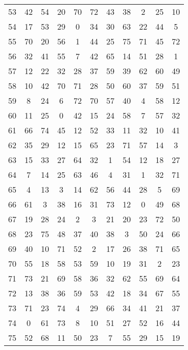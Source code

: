 \begin{table}
\begin{tabular}{c c c c c c c c c c c }
53 & 42 & 54 & 20 & 70 & 72 & 43 & 38 & 2 & 25 & 10 \\
54 & 17 & 53 & 29 & 0 & 34 & 30 & 63 & 22 & 44 & 5 \\
55 & 70 & 20 & 56 & 1 & 44 & 25 & 75 & 71 & 45 & 72 \\
56 & 32 & 41 & 55 & 7 & 42 & 65 & 14 & 51 & 28 & 1 \\
57 & 12 & 22 & 32 & 28 & 37 & 59 & 39 & 62 & 60 & 49 \\
58 & 10 & 42 & 70 & 71 & 28 & 50 & 60 & 37 & 59 & 51 \\
59 & 8 & 24 & 6 & 72 & 70 & 57 & 40 & 4 & 58 & 12 \\
60 & 11 & 25 & 0 & 42 & 15 & 24 & 58 & 7 & 57 & 32 \\
61 & 66 & 74 & 45 & 12 & 52 & 33 & 11 & 32 & 10 & 41 \\
62 & 35 & 29 & 12 & 15 & 65 & 23 & 71 & 57 & 14 & 3 \\
63 & 15 & 33 & 27 & 64 & 32 & 1 & 54 & 12 & 18 & 27 \\
64 & 7 & 14 & 25 & 63 & 46 & 4 & 31 & 1 & 32 & 71 \\
65 & 4 & 13 & 3 & 14 & 62 & 56 & 44 & 28 & 5 & 69 \\
66 & 61 & 3 & 38 & 16 & 31 & 73 & 12 & 0 & 49 & 68 \\
67 & 19 & 28 & 24 & 2 & 3 & 21 & 20 & 23 & 72 & 50 \\
68 & 23 & 75 & 48 & 37 & 40 & 38 & 3 & 50 & 24 & 66 \\
69 & 40 & 10 & 71 & 52 & 2 & 17 & 26 & 38 & 71 & 65 \\
70 & 55 & 18 & 58 & 53 & 59 & 10 & 19 & 31 & 2 & 23 \\
71 & 73 & 21 & 69 & 58 & 36 & 32 & 62 & 55 & 69 & 64 \\
72 & 13 & 38 & 36 & 59 & 53 & 42 & 18 & 34 & 67 & 55 \\
73 & 71 & 23 & 74 & 4 & 29 & 66 & 34 & 41 & 21 & 37 \\
74 & 0 & 61 & 73 & 8 & 10 & 51 & 27 & 52 & 16 & 44 \\
75 & 52 & 68 & 11 & 50 & 23 & 7 & 55 & 29 & 15 & 19 \\
\hline
\end{tabular}
\end{table}